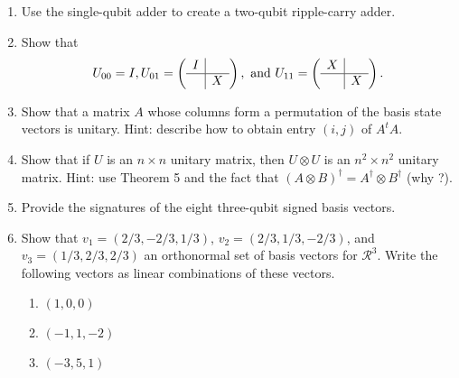 \documentclass [12pt]{article}
\theoremstyle{definition}
\begin{document}
\begin{enumerate}
\begin{center}
\end{center}


\item Use the single-qubit adder to create a two-qubit ripple-carry adder.

\item Show that 
\[U_{00} = I, U_{01} = 
\left(\begin{array}{c|c}
I & \\
\hline
 &  X \\
\end{array}\right), \mbox{ and }
 U_{11} = 
\left(\begin{array}{c|c}
X & \\
\hline
 &  X \\
\end{array}\right).
\]

\item 
\label{ex:unitary}
Show that a matrix $A$ whose columns form a permutation of the basis state vectors is unitary.
Hint: describe how to obtain entry $(i,j)$ of $A^t A$.

\item Show that if $U$ is an $n\times n$ unitary matrix, then $U\otimes U$ is an $n^2\times n^2$ unitary matrix.
Hint: use Theorem 5 and the fact that $(A\otimes B)^{\dagger} = A^{\dagger}\otimes B^{\dagger}$ (why ?).

\item Provide the signatures of the eight three-qubit signed basis vectors.

\item Show that $v_{1}=(2/3,-2/3,1/3)$, $v_{2}=(2/3,1/3,-2/3)$, and $v_{3}=(1/3,2/3,2/3)$ an orthonormal set of basis vectors for $\mathcal{R}^3$.
Write the following vectors as linear combinations of these vectors.
\begin{enumerate}
\item $(1,0,0)$
\item $(-1,1,-2)$
\item $(-3,5,1)$
\end{enumerate}



\end{enumerate}
\end{document}
